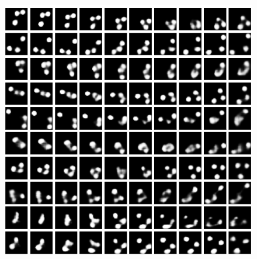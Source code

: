 \begin{frame}
\begin{figure}[h!]
\begin{minipage}{0.32\textwidth}
		\includegraphics[scale=0.12]{Bilder/bouncingBalls_VAElat}
	\end{minipage}
	\begin{minipage}{0.32\textwidth}
		\hfill
	\end{minipage}
\end{figure}

\end{frame}



